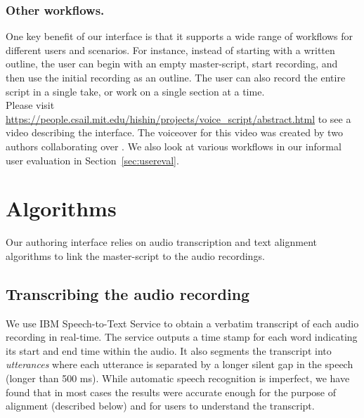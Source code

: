 \subsubsection{Other workflows.} 
One key benefit of our interface is that it supports a wide range of workflows for different users and scenarios. For instance, instead of starting with a written outline, the user can begin with an empty master-script, start recording, and then use the initial recording as an outline. The user can also record the entire script in a single take, or work on a single section at a time. \\

Please visit \url{https://people.csail.mit.edu/hishin/projects/voice_script/abstract.html} to see a video describing the interface. The voiceover for this video was created by two authors collaborating over \voicescript . We also look at various workflows in our informal user evaluation in Section~\ref{sec:usereval}. 

\section{Algorithms}
\label{sec:algorithms}
Our authoring interface relies on audio transcription and text alignment algorithms to link the master-script to the audio recordings.  

\subsection{Transcribing the audio recording}
We use IBM Speech-to-Text Service \cite{ibmspeechtotext} to obtain a verbatim transcript of each audio recording in real-time. The service outputs a time stamp for each word indicating its start and end time within the audio. It also segments the transcript into \textit{utterances} where each utterance is separated by a longer silent gap in the speech (longer than 500 ms). While automatic speech recognition is imperfect, we have found that in most cases the results were accurate enough for the purpose of alignment (described below) and for users to understand the transcript. 
  
